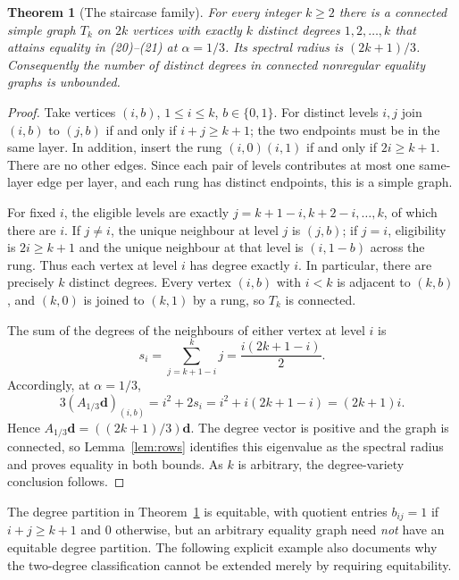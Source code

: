 \documentclass[11pt]{amsart}
\newtheorem{theorem}{Theorem}[section]
\theoremstyle{remark}
\newcommand{\dd}{\boldsymbol{d}}
\begin{document}
\begin{theorem}[The staircase family]\label{thm:stairs}
For every integer $k\geq2$ there is a connected simple graph
$T_k$ on $2k$ vertices with exactly $k$ distinct degrees
$1,2,\ldots,k$ that attains equality in (20)--(21) at
$\alpha=1/3$. Its spectral radius is $(2k+1)/3$.
Consequently the number of distinct degrees in connected
nonregular equality graphs is unbounded.
\end{theorem}
\begin{proof}
Take vertices $(i,b)$, $1\leq i\leq k$, $b\in\{0,1\}$.
For distinct levels $i,j$ join $(i,b)$ to $(j,b)$ if and only if
$i+j\geq k+1$; the two endpoints must be in the same layer.
In addition, insert the rung $(i,0)(i,1)$ if and only if
$2i\geq k+1$. There are no other edges. Since each pair of
levels contributes at most one same-layer edge per layer,
and each rung has distinct endpoints, this is a simple graph.

For fixed $i$, the eligible levels are exactly
$j=k+1-i,k+2-i,\ldots,k$, of which there are $i$.
If $j\ne i$, the unique neighbour at level $j$ is $(j,b)$;
if $j=i$, eligibility is $2i\geq k+1$ and the unique
neighbour at that level is $(i,1-b)$ across the rung.
Thus each vertex at level $i$ has degree exactly $i$.
In particular, there are precisely $k$ distinct degrees.
Every vertex $(i,b)$ with $i<k$ is adjacent to $(k,b)$,
and $(k,0)$ is joined to $(k,1)$ by a rung, so $T_k$
is connected.

The sum of the degrees of the neighbours of either vertex
at level $i$ is
\[
 s_i=\sum_{j=k+1-i}^{k}j
     =\frac{i(2k+1-i)}2.
\]
Accordingly, at $\alpha=1/3$,
\[
 3(A_{1/3}\dd)_{(i,b)}
   =i^2+2s_i=i^2+i(2k+1-i)=(2k+1)i.
\]
Hence $A_{1/3}\dd=((2k+1)/3)\dd$.
The degree vector is positive and the graph is connected,
so Lemma~\ref{lem:rows} identifies this eigenvalue as the
spectral radius and proves equality in both bounds.
As $k$ is arbitrary, the degree-variety conclusion follows.
\end{proof}

The degree partition in Theorem~\ref{thm:stairs} is equitable,
with quotient entries $b_{ij}=1$ if $i+j\geq k+1$ and $0$
otherwise, but an arbitrary equality graph need \emph{not}
have an equitable degree partition. The following explicit
example also documents why the two-degree classification
cannot be extended merely by requiring equitability.
\end{document}
